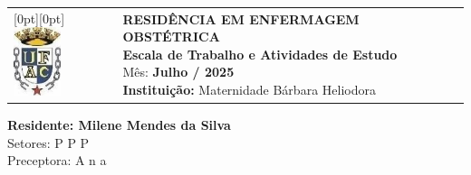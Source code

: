 \begin{flushleft}
    \begin{tabular}{@{}l l@{}}
        \raisebox{0pt}[0pt][0pt]{\includegraphics[height=2cm]{escala/recursos/ufac-logo.jpeg}} &
        \parbox[b][2cm][t]{0.82\linewidth}{
            \raggedright
            {\fontsize{11pt}{13pt}\selectfont
                \textbf{RESIDÊNCIA EM ENFERMAGEM OBSTÉTRICA} \\
                \textbf{Escala de Trabalho e Atividades de Estudo} \\
                Mês:\textbf{ Julho / 2025 }\\
                \textbf{Instituição:} Maternidade Bárbara Heliodora
            }
        }
    \end{tabular}

    {\fontsize{12pt}{14pt}\selectfont
        \textbf{Residente: Milene Mendes da Silva} \\
        Setores: P P P\\
        Preceptora: A n a
    }
\end{flushleft}